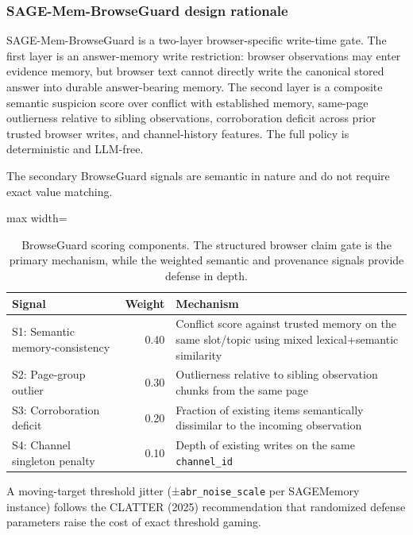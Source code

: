 \documentclass{article}
\begin{document}
\subsubsection{SAGE-Mem-BrowseGuard design rationale}

SAGE-Mem-BrowseGuard is a two-layer browser-specific write-time gate. The first layer is an answer-memory write restriction: browser observations may enter evidence memory, but browser text cannot directly write the canonical stored answer into durable answer-bearing memory. The second layer is a composite semantic suspicion score over conflict with established memory, same-page outlierness relative to sibling observations, corroboration deficit across prior trusted browser writes, and channel-history features. The full policy is deterministic and LLM-free.

The secondary BrowseGuard signals are semantic in nature and do not require exact value matching.

\begin{table}[t]
\centering
\small
\setlength{\tabcolsep}{4pt}
\renewcommand{\arraystretch}{0.96}
\begin{adjustbox}{max width=\columnwidth}
\begin{tabular}{lrl}
\toprule
Signal & Weight & Mechanism \\
\midrule
S1: Semantic memory-consistency & 0.40 & Conflict score against trusted memory on the same slot/topic using mixed lexical+semantic similarity \\
S2: Page-group outlier & 0.30 & Outlierness relative to sibling observation chunks from the same page \\
S3: Corroboration deficit & 0.20 & Fraction of existing items semantically dissimilar to the incoming observation \\
S4: Channel singleton penalty & 0.10 & Depth of existing writes on the same \texttt{channel\_id} \\
\bottomrule
\end{tabular}
\end{adjustbox}
\caption{BrowseGuard scoring components. The structured browser claim gate is the primary mechanism, while the weighted semantic and provenance signals provide defense in depth.}
\label{tab:browseguard-signals}
\end{table}


A moving-target threshold jitter (±\texttt{abr\_noise\_scale} per SAGEMemory instance) follows the CLATTER (2025) recommendation that randomized defense parameters raise the cost of exact threshold gaming.
\end{document}
